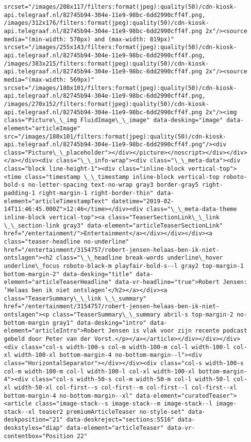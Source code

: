\documentclass[11pt]{article}
\begin{document}
\begin{Verbatim}[commandchars=\\\{\}]
srcset="/images/208x117/filters:format(jpeg):quality(50)/cdn-kiosk-api.telegraaf.nl/82745b94-304e-11e9-98bc-6dd2990cff4f.png, /images/312x176/filters:format(jpeg):quality(50)/cdn-kiosk-api.telegraaf.nl/82745b94-304e-11e9-98bc-6dd2990cff4f.png 2x"/><source media="(min-width: 570px) and (max-width: 819px)" srcset="/images/255x143/filters:format(jpeg):quality(50)/cdn-kiosk-api.telegraaf.nl/82745b94-304e-11e9-98bc-6dd2990cff4f.png, /images/383x215/filters:format(jpeg):quality(50)/cdn-kiosk-api.telegraaf.nl/82745b94-304e-11e9-98bc-6dd2990cff4f.png 2x"/><source media="(max-width: 569px)" srcset="/images/180x101/filters:format(jpeg):quality(50)/cdn-kiosk-api.telegraaf.nl/82745b94-304e-11e9-98bc-6dd2990cff4f.png, /images/270x152/filters:format(jpeg):quality(50)/cdn-kiosk-api.telegraaf.nl/82745b94-304e-11e9-98bc-6dd2990cff4f.png 2x"/><img class="Picture\_\_img FluidImage\_\_image" data-desking="image" data-element="articleImage" src="/images/180x101/filters:format(jpeg):quality(50)/cdn-kiosk-api.telegraaf.nl/82745b94-304e-11e9-98bc-6dd2990cff4f.png"/><div class="Picture\_\_placeholder"></div></picture></noscript></div></div></a></div><div class="\_\_info-wrap"><div class="\_\_meta-data"><div class="block line-height-1"><div class="inline-block vertical-top"><time class="timestamp \_\_timestamp inline-block vertical-top roboto-bold-s no-letter-spacing text-no-wrap gray3 border-gray5 right-padding-1 right-margin-1 right-border-thin" data-element="articleTimestampText" datetime="2019-02-14T11:46:45.000Z">12:46</time></div><div class="\_\_meta-data-theme inline-block vertical-top"><a class="TeaserSectionLink\_\_link \_\_section-link gray3" data-element="articleTeaserSectionLink" href="/entertainment/">Entertainment</a></div></div></div><a class="teaser-headline no-underline" href="/entertainment/3154757/robert-jensen-helaas-ben-ik-niet-ontslagen"><h2 class="\_\_headline break-words underline\_hover underline\_focus roboto-black-m playfair-bold-s--l gray2 top-margin-1 bottom-margin-2" data-desking="title" data-element="articleTeaserHeadline" data-vr-headline="true">Robert Jensen: ’Helaas ben ik niet ontslagen’</h2></a></div><a class="TeaserSummary\_\_link \_\_summary" href="/entertainment/3154757/robert-jensen-helaas-ben-ik-niet-ontslagen"><p class="TeaserSummary\_\_summary abril-s top-margin-2 no-bottom-margin gray1" data-desking="intro" data-element="articleIntro">Robert Jensen is vlak voor zijn recente podcast gebeld door Peter van der Vorst.</p></a></article></div></div></div><div class="col-s width-100-s col-m width-100-m col-l width-100-l col-xl width-100-xl bottom-margin-4 no-bottom-margin--l"><div class="HorizontalSeparator"></div></div><div class="col-s width-100-s col-m width-100-m col-l width-100-l col-xl width-100-xl bottom-margin-4"><div class="col-s width-50-s col-m width-50-m col-l width-50-l col-xl width-50-xl col-first--s col-first--m col-first--l col-first--xl bottom-margin-4 no-bottom-margin--xl" data-element="curatedTeaser"><article class="image-stack--s image-stack--m image-stack--l image-stack--xl teaser2 premiumArticleTeaser no-style-set" data-deskposition="21" data-deskreject="sections:5516" data-deskstyles="diap" data-element="articleTeaser" data-vr-contentbox="Position 22" 
\end{Verbatim}
\end{document}
